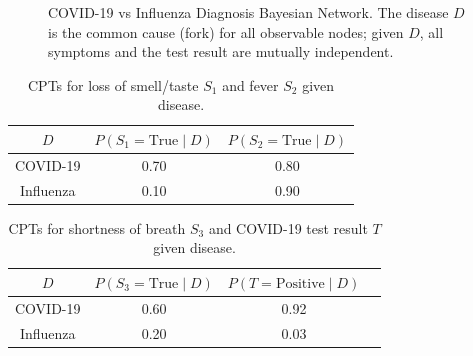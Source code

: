 \begin{figure}[htbp]
\centering
{}
\caption{COVID-19 vs Influenza Diagnosis Bayesian Network. The disease $D$
         is the common cause (fork) for all observable nodes; given $D$, all
         symptoms and the test result are mutually independent.}
\label{fig:general_medical_bn}
\end{figure}

\begin{table}[H]
\centering
\begin{tabular}{ccc}
\hline
$D$ & $P(S_1=\text{True}\mid D)$ & $P(S_2=\text{True}\mid D)$ \\\hline
COVID-19  & 0.70 & 0.80 \\
Influenza & 0.10 & 0.90 \\\hline
\end{tabular}
\caption{CPTs for loss of smell/taste $S_1$ and fever $S_2$ given disease.}
\end{table}

\begin{table}[H]
\centering
\begin{tabular}{cccc}
\hline
$D$ & $P(S_3=\text{True}\mid D)$ & $P(T=\text{Positive}\mid D)$ \\\hline
COVID-19  & 0.60 & 0.92 \\
Influenza & 0.20 & 0.03 \\\hline
\end{tabular}
\caption{CPTs for shortness of breath $S_3$ and COVID-19 test result $T$ given disease.}
\end{table}


